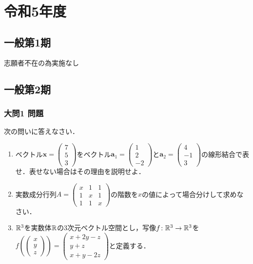\documentclass[dvipdfmx]{jsreport}
\begin{document}
\part{令和5年度}
\chapter{一般第1期}
	志願者不在の為実施なし
\chapter{一般第2期}
\section{大問1 問題}
\begin{tcolorbox} %
	次の問いに答えなさい．
\begin{enumerate}
	\item ベクトル$\bm{x}= \begin{pmatrix}7\\ 5\\ 3\end{pmatrix}$をベクトル$\bm{a}_1= \begin{pmatrix}1\\ 2\\ -2\end{pmatrix}$と$\bm{a}_2= \begin{pmatrix}4\\ -1\\ 3\end{pmatrix}$の線形結合で表せ．表せない場合はその理由を説明せよ．
	\item 実数成分行列$A= \begin{pmatrix}x& 1& 1\\ 1& x& 1\\ 1& 1& x\end{pmatrix}$の階数を$x$の値によって場合分けして求めなさい．
	\item $\mathbb{R}^3$を実数体$\mathbb{R}$の3次元ベクトル空間とし，写像$f\colon \mathbb{R}^3\to \mathbb{R}^3$を$f\left(\begin{pmatrix}x\\ y\\ z\end{pmatrix}\right)= \begin{pmatrix}{x+ 2y- z}\\ {y+ z}\\ {x+ y- 2z}\end{pmatrix}$と定義する．
\end{enumerate}
\end{tcolorbox}
\end{document}
